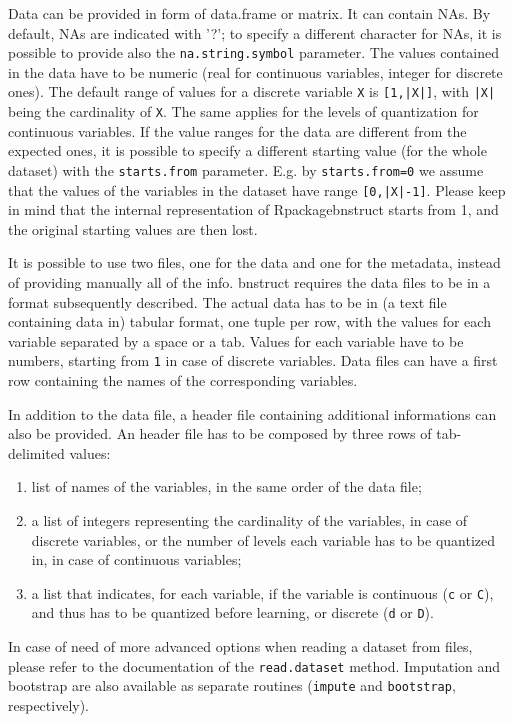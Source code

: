 \documentclass{article}\usepackage[]{graphicx}\usepackage[]{color}
\begin{document}
Data can be provided in form of data.frame or matrix. It can contain NAs. By default, NAs are indicated with '?';
to specify a different character for NAs, it is possible to provide also the \texttt{na.string.symbol} parameter.
The values contained in the data have to be numeric (real for continuous variables, integer for discrete ones).
The default range of values for a discrete variable \texttt{X} is \texttt{[1,|X|]}, with \texttt{|X|} being
the cardinality of \texttt{X}. The same applies for the levels of quantization for continuous variables.
If the value ranges for the data are different from the expected ones, it is possible to specify a different
starting value (for the whole dataset) with the \texttt{starts.from} parameter. E.g. by \texttt{starts.from=0}
we assume that the values of the variables in the dataset have range \texttt{[0,|X|-1]}.
Please keep in mind that the internal representation of Rpackage{bnstruct} starts from 1,
and the original starting values are then lost. 

It is possible to use two files, one for the data and one for the metadata,
instead of providing manually all of the info. 
bnstruct requires the data files to be in a format subsequently described.
The actual data has to be in (a text file containing data in) tabular format, one tuple per row,
with the values for each variable separated by a space or a tab. Values for each variable have to be
numbers, starting from \texttt{1} in case of discrete variables.
Data files can have a first row containing the names of the corresponding variables.

In addition to the data file, a header file containing additional informations can also be provided.
An header file has to be composed by three rows of tab-delimited values:
\begin{enumerate}
\item list of names of the variables, in the same order of the data file;
\item a list of integers representing the cardinality of the variables, in case of discrete variables,
 or the number of levels each variable has to be quantized in, in case of continuous variables;
\item a list that indicates, for each variable, if the variable is continuous
 (\texttt{c} or \texttt{C}), and thus has to be quantized before learning,
 or discrete (\texttt{d} or \texttt{D}).
\end{enumerate}
In case of need of more advanced options when reading a dataset from files, please refer to the
documentation of the \texttt{read.dataset} method. Imputation and bootstrap are also available
as separate routines (\texttt{impute} and \texttt{bootstrap}, respectively).
\end{document}
